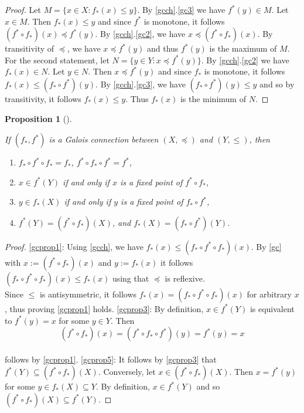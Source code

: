 \documentclass[
  twoside,
  12pt,
  letterpaper,
  fleqn]{article}
\providecommand{\tightlist}{%
  \setlength{\itemsep}{0pt}\setlength{\parskip}{0pt}}\usepackage{longtable,booktabs,array}
\theoremstyle{definition}
\theoremstyle{definition}
\theoremstyle{plain}
\newtheorem{proposition}{Proposition}[section]
\theoremstyle{remark}
\begin{document}
\begin{proof}

Let \(M=\{x\in X: f_*(x)\leqslant y\}\). By \eqref{gcch}.\eqref{gc3} we
have \(f^*(y)\in M\). Let \(x\in M\). Then \(f_*(x)\leqslant y\) and
since \(f^*\) is monotone, it follows
\((f^*\circ f_*)(x)\preceq f^*(y)\). By \eqref{gcch}.\eqref{gc2}, we
have \(x\preceq (f^*\circ f_*)(x)\). By transitivity of \(\preceq\), we
have \(x\preceq f^*(y)\) and thus \(f^*(y)\) is the maximum of \(M\).
For the second statement, let \(N=\{y\in Y : x\preceq f^*(y)\}\). By
\eqref{gcch}.\eqref{gc2} we have \(f_*(x)\in N\). Let \(y\in N\). Then
\(x\preceq f^*(y)\) and since \(f_*\) is monotone, it follows
\(f_*(x)\leqslant (f_*\circ f^*)(y)\). By \eqref{gcch}.\eqref{gc3}, we
have \((f_*\circ f^*)(y)\leqslant y\) and so by transitivity, it follows
\(f_*(x)\leqslant y\). Thus \(f_*(x)\) is the minimum of \(N\).

\end{proof}

\begin{proposition}[]\protect\hypertarget{prp-}{}\label{prp-}

If \((f_*, f^*)\) is a Galois connection between \((X,\preceq)\) and
\((Y,\leqslant)\), then

\begin{enumerate}
\def\labelenumi{\arabic{enumi}.}
\tightlist
\item
  \(f_*\circ f^* \circ f_*=f_*\), \(f^*\circ f_* \circ f^*=f^*\),
\item
  \(x\in f^*(Y)\) if and only if \(x\) is a fixed point of
  \(f^*\circ f_*\),
\item
  \(y\in f_*(X)\) if and only if \(y\) is a fixed point of
  \(f_*\circ f^*\),
\item
  \(f^*(Y)=(f^*\circ f_*)(X)\), and \(f_*(X)=(f_*\circ f^*)(Y)\).
\end{enumerate}

\end{proposition}

\begin{proof}

\eqref{gcprop1}: Using \eqref{gcch}, we have
\(f_*(x)\leqslant (f_*\circ f^*\circ f_*)(x)\). By \eqref{gc} with
\(x:=(f^*\circ f_*)(x)\) and \(y:=f_*(x)\) it follows
\((f_*\circ f^* \circ f_*)(x)\leqslant f_*(x)\) using that \(\preceq\)
is reflexive.\\
Since \(\leqslant\) is antisymmetric, it follows
\(f_*(x)=(f_*\circ f^*\circ f_*)(x)\) for arbitrary \(x\), thus proving
\eqref{gcprop1} holds. \eqref{gcprop3}: By definition, \(x\in f^*(Y)\)
is equivalent to \(f^*(y)=x\) for some \(y\in Y\). Then \[
(f^*\circ f_*)(x)=(f^*\circ f_* \circ f^*)(y)=f^*(y)=x
\]\\
follows by \eqref{gcprop1}. \eqref{gcprop5}: It follows by
\eqref{gcprop3} that \(f^*(Y)\subseteq (f^*\circ f_*)(X)\). Conversely,
let \(x\in (f^*\circ f_*)(X)\). Then \(x=f^*(y)\) for some
\(y\in f_*(X)\subseteq Y\). By definition, \(x\in f^*(Y)\) and so
\((f^*\circ f_*)(X)\subseteq f^*(Y)\).

\end{proof}
\end{document}
